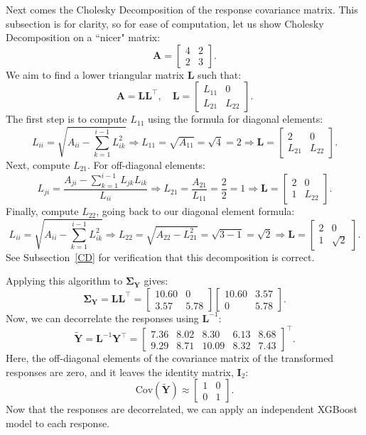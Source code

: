 \documentclass[11pt]{report} %
\begin{document}
Next comes the Cholesky Decomposition of the response covariance matrix. This subsection is for clarity, so for ease of computation, let us show Cholesky Decomposition on a ``nicer" matrix:
\[
\mathbf{A} =
\begin{bmatrix}
4 & 2 \\
2 & 3
\end{bmatrix}.
\]
We aim to find a lower triangular matrix \( \mathbf{L} \) such that:
\[
\mathbf{A} = \mathbf{L} \mathbf{L}^\top, \quad
\mathbf{L} =
\begin{bmatrix}
L_{11} & 0 \\
L_{21} & L_{22}
\end{bmatrix}.
\]
The first step is to compute \( L_{11} \) using the formula for diagonal elements:
\[
L_{ii} = \sqrt{A_{ii} - \sum_{k=1}^{i-1} L_{ik}^2}
\Rightarrow
L_{11} = \sqrt{A_{11}} = \sqrt{4} = 2
\Rightarrow
\mathbf{L} =
\begin{bmatrix}
2 & 0 \\
L_{21} & L_{22}
\end{bmatrix}.
\]
Next, compute \( L_{21} \). For off-diagonal elements:
\[
L_{ji} = \frac{A_{ji} - \sum_{k=1}^{i-1} L_{jk} L_{ik}}{L_{ii}} \Rightarrow
L_{21} = \frac{A_{21}}{L_{11}} = \frac{2}{2} = 1
\Rightarrow
\mathbf{L} =
\begin{bmatrix}
2 & 0 \\
1 & L_{22}
\end{bmatrix}.
\]
Finally, compute \( L_{22} \), going back to our diagonal element formula:
\[
L_{ii} = \sqrt{A_{ii} - \sum_{k=1}^{i-1} L_{ik}^2}
\Rightarrow
L_{22} = \sqrt{A_{22} - L_{21}^2} = \sqrt{3 - 1} = \sqrt{2}
\Rightarrow
\mathbf{L} =
\begin{bmatrix}
2 & 0 \\
1 & \sqrt{2}
\end{bmatrix}.
\]
See Subsection~\ref{CD} for verification that this decomposition is correct.

\noindent Applying this algorithm to $\mathbf{\Sigma_Y}$ gives:
\[
\mathbf{\Sigma_Y} = \mathbf{L}\mathbf{L}^\top=
   \begin{bmatrix}
    10.60 & 0 \\
    3.57 & 5.78
   \end{bmatrix}
   \begin{bmatrix}
       10.60 & 3.57 \\
       0 & 5.78
   \end{bmatrix}.
\]
Now, we can decorrelate the responses using $\mathbf{L}^{-1}$:
\[
\tilde{\mathbf{Y}}=
\mathbf{L}^{-1}\mathbf{Y}^\top =
\begin{bmatrix}
7.36 & 8.02 & 8.30 & 6.13 & 8.68 \\
9.29 & 8.71 & 10.09 & 8.32 & 7.43
\end{bmatrix}^\top.
\]
Here, the off-diagonal elements of the covariance matrix of the transformed responses are zero, and it leaves the identity matrix, $\mathbf{I}_2$:
\[
\text{Cov}(\tilde{\mathbf{Y}}) \approx
\begin{bmatrix}
1 & 0 \\
0 & 1
\end{bmatrix}.
\]
Now that the responses are decorrelated, we can apply an independent XGBoost model to each response.
\end{document}
